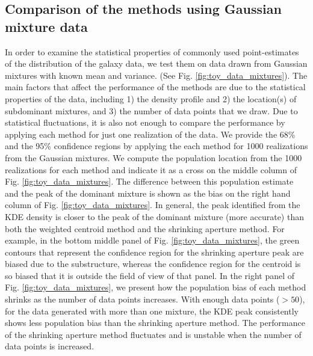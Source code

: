 \subsection{Comparison of the methods using Gaussian mixture data}
In order to examine the statistical properties of commonly used point-estimates 
of the distribution of the galaxy data, we test them on data drawn 
from Gaussian mixtures with known mean and variance. 
(See Fig.
\ref{fig:toy_data_mixtures}). 
The main factors that affect the performance of 
the methods are due to the statistical properties of the data, 
including 1) the density profile and 2) the
location(s) of subdominant mixtures, and 3) the number of data points that we draw.
Due to statistical fluctuations, it is also not enough to
compare the performance by applying each method for just one realization of the
data. We provide the 68\% and the 95\% confidence regions by applying the
each method for 1000 realizations from the Gaussian mixtures.
We compute the population location from the 1000 realizations for each method 
and indicate it as a cross on the middle column of Fig. \ref{fig:toy_data_mixtures}.
The difference between this population estimate and the peak of the dominant mixture 
is shown as the bias on the right hand column of Fig.
\ref{fig:toy_data_mixtures}.
In general, the peak identified from the KDE density is closer to the 
peak of the dominant mixture (more accurate) than 
both the weighted centroid method and the shrinking aperture method.
For example, in the bottom middle panel of Fig. \ref{fig:toy_data_mixtures}, 
the green contours
that represent the confidence region for the shrinking aperture peak are
biased due to the substructure, whereas the confidence region for the centroid 
is so biased that it is outside the field of view of that panel.
In the right panel of Fig. \ref{fig:toy_data_mixtures}, 
we present how the population bias of each method shrinks as the
number of data points increases. With enough data points ($> 50$), 
for the data generated with more than one mixture, 
the KDE peak consistently shows less population bias than the shrinking aperture method. 
The performance of the shrinking aperture method fluctuates and is unstable when
the number of data points is increased.

